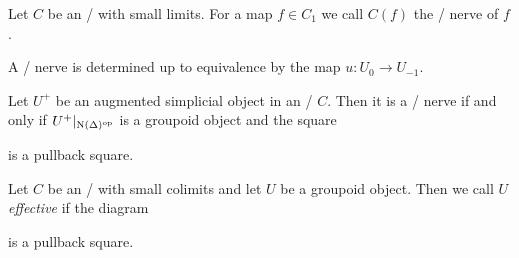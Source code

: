 \begin{definition}
    Let $C$ be an \inftycat/ with small limits. 
    For a map $f\in C_1$ we call $C(f)$ the \Cech/ nerve of $f$.
\end{definition}
\begin{lemma}
    A \Cech/ nerve is determined up to equivalence by the map $u\colon U_0\to U_{-1}$.
\end{lemma}
\begin{prop}\label{prop:grpdEffectiveIfPullback} %
    Let $U^+$ be an augmented simplicial object in an \inftycat/ $C$.
    Then it is a \Cech/ nerve if and only if $U^+|_{\operatorname{N}(\Delta)^{\operatorname{op}}}$ is a groupoid object and the square
    \begin{center}
    \end{center}
    is a pullback square.
\end{prop}
\begin{definition}
    Let $C$ be an \inftycat/ with small colimits and let $U$ be a groupoid object.
    Then we call $U$ \emph{effective} if the diagram 
    \begin{center}
    \end{center}
    is a pullback square.
\end{definition}
